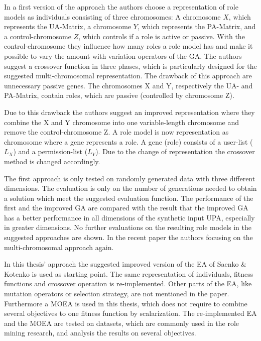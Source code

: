 In a first version of the approach the authors choose a representation of role models as individuals consisting of three chromosomes: A chromosome $X$, which represents the UA-Matrix, a chromosome $Y$, which represents the PA-Matrix, and a control-chromosome $Z$, which controls if a role is active or passive. With the control-chromosome they influence how many roles a role model has and make it possible to vary the amount with variation operators of the GA. The authors suggest a crossover function in three phases, which is particularly designed for the suggested multi-chromosomal representation. The drawback of this approach are unnecessary passive genes. The chromosomes X and Y, respectively the UA- and PA-Matrix, contain roles, which are passive (controlled by chromosome Z).

Due to this drawback the authors suggest an improved representation where they combine the X and Y chromosome into one variable-length chromosome and remove the control-chromosome Z. A role model is now representation as chromosome where a gene represents a role. A gene (role) consists of a user-list ($L_X$) and a permission-list ($L_Y$). Due to the change of representation the crossover method is changed accordingly.

The first approach is only tested on randomly generated data with three different dimensions\cite{Igor}. The evaluation is only on the number of generations needed to obtain a solution which meet the suggested evaluation function. The performance of the first and the improved GA are compared with the result that the improved GA has a better performance in all dimensions of the synthetic input UPA, especially in greater dimensions\cite{saenko2012design}. No further evaluations on the resulting role models in the suggested approaches are shown. In the recent paper \cite{Kotenko:2015} the authors focusing on the multi-chromosomal approach again.

In this thesis' approach the suggested improved version of the EA of Saenko \& Kotenko\cite{saenko2012design} is used as starting point. The same representation of individuals, fitness functions and crossover operation is re-implemented. Other parts of the EA, like mutation operators or selection strategy, are not mentioned in the paper. Furthermore a MOEA is used in this thesis, which does not require to combine several objectives to one fitness function by scalarization. The re-implemented EA and the MOEA are tested on datasets, which are commonly used in the role mining research, and analysis the results on several objectives.